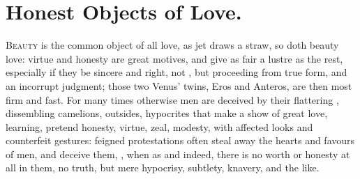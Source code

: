{%
\section{Honest Objects of Love.}

\lettrine{B}{eauty} is the common object of all love, as jet draws a straw, so
doth beauty love: virtue and honesty are great motives, and give as
fair a lustre as the rest, especially if they be sincere and right, not
, but proceeding from true form, and an incorrupt judgment; those
two Venus' twins, Eros and Anteros, are then most firm and fast. For
many times otherwise men are deceived by their flattering ,
dissembling camelions, outsides, hypocrites that make a show of great
love, learning, pretend honesty, virtue, zeal, modesty, with affected
looks and counterfeit gestures: feigned protestations often steal away
the hearts and favours of men, and deceive them, , when as  and indeed, there is no worth or honesty at all
in them, no truth, but mere hypocrisy, subtlety, knavery, and the like.

}

